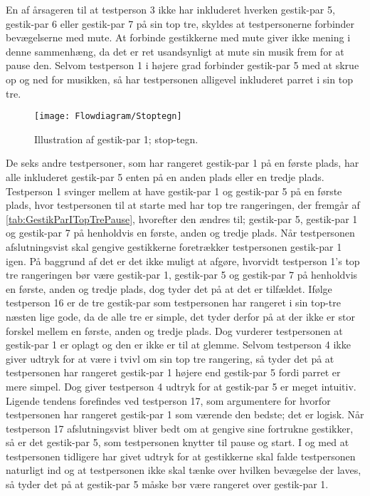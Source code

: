 En af årsageren til at testperson 3 ikke har inkluderet hverken gestik-par 5, gestik-par 6 eller gestik-par 7 på sin top tre, skyldes at testpersonerne forbinder bevægelserne med mute. At forbinde gestikkerne med mute giver ikke mening i denne sammenhæng, da det er ret usandsynligt at mute sin musik frem for at pause den. Selvom testperson 1 i højere grad forbinder gestik-par 5 med at skrue op og ned for musikken, så har testpersonen alligevel inkluderet parret i sin top tre.
%
\begin{figure}[H]
	\centering
	\texttt{[image: Flowdiagram/Stoptegn]}
	\caption{Illustration af gestik-par 1; stop-tegn.}
	\label{fig:GestikPar1Pause}
\end{figure}
\noindent
% 	 
De seks andre testpersoner, som har rangeret gestik-par 1 på en første plads, har alle inkluderet gestik-par 5 enten på en anden plads eller en tredje plads. Testperson 1 svinger mellem at have gestik-par 1 og gestik-par 5 på en første plads, hvor testpersonen til at starte med har top tre rangeringen, der fremgår af \autoref{tab:GestikParITopTrePause}, hvorefter den ændres til; gestik-par 5, gestik-par 1 og gestik-par 7 på henholdvis en første, anden og tredje plads. Når testpersonen afslutningsvist skal gengive gestikkerne foretrækker testpersonen gestik-par 1 igen. På baggrund af det er det ikke muligt at afgøre, hvorvidt testperson 1's top tre rangeringen bør være gestik-par 1, gestik-par 5 og gestik-par 7 på henholdvis en første, anden og tredje plads, dog tyder det på at det er tilfældet. Ifølge testperson 16 er de tre gestik-par som testpersonen har rangeret i sin top-tre næsten lige gode, da de alle tre er simple, det tyder derfor på at der ikke er stor forskel mellem en første, anden og tredje plads. Dog vurderer testpersonen at gestik-par 1 er oplagt og den er ikke er til at glemme. Selvom testperson 4 ikke giver udtryk for at være i tvivl om sin top tre rangering, så tyder det på at testpersonen har rangeret gestik-par 1 højere end gestik-par 5 fordi parret er mere simpel. Dog giver testperson 4 udtryk for at gestik-par 5 er meget intuitiv. Ligende tendens forefindes ved testperson 17, som argumentere for hvorfor testpersonen har rangeret gestik-par 1 som værende den bedste; det er logisk. Når testperson 17 afslutningsvist bliver bedt om at gengive sine fortrukne gestikker, så er det gestik-par 5, som testpersonen knytter til pause og start. I og med at testpersonen tidligere har givet udtryk for at gestikkerne skal falde testpersonen naturligt ind og at testpersonen ikke skal tænke over hvilken bevægelse der laves, så tyder det på at gestik-par 5 måske bør være rangeret over gestik-par 1.   

